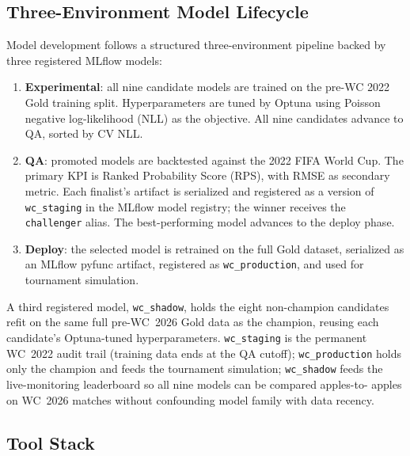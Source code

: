 \documentclass[conference]{IEEEtran}
\begin{document}
\subsection{Three-Environment Model Lifecycle}

Model development follows a structured three-environment pipeline backed
by three registered MLflow models:

\begin{enumerate}
  \item \textbf{Experimental}: all nine candidate models are trained on the pre-WC 2022
  Gold training split. Hyperparameters are tuned by Optuna using Poisson negative
  log-likelihood (NLL) as the objective. All nine candidates advance
  to QA, sorted by CV NLL.
  \item \textbf{QA}: promoted models are backtested against the 2022 FIFA World Cup.
  The primary KPI is Ranked Probability Score (RPS), with RMSE as secondary metric.
  Each finalist's artifact is serialized and registered as a version
  of \texttt{wc\_staging} in the MLflow model registry; the winner receives
  the \texttt{challenger} alias.
  The best-performing model advances to the deploy phase.
  \item \textbf{Deploy}: the selected model is retrained on the full Gold dataset,
  serialized as an MLflow pyfunc artifact, registered as \texttt{wc\_production}, 
  and used for tournament simulation.
\end{enumerate}

A third registered model, \texttt{wc\_shadow}, holds the eight
non-champion candidates refit on the same full pre-WC~2026 Gold data as
the champion, reusing each candidate's Optuna-tuned hyperparameters.
\texttt{wc\_staging} is the permanent WC~2022 audit trail (training data
ends at the QA cutoff); \texttt{wc\_production} holds only the champion
and feeds the tournament simulation; \texttt{wc\_shadow} feeds the
live-monitoring leaderboard so all nine models can be compared apples-to-
apples on WC~2026 matches without confounding model family with data
recency.

\subsection{Tool Stack}
\end{document}
